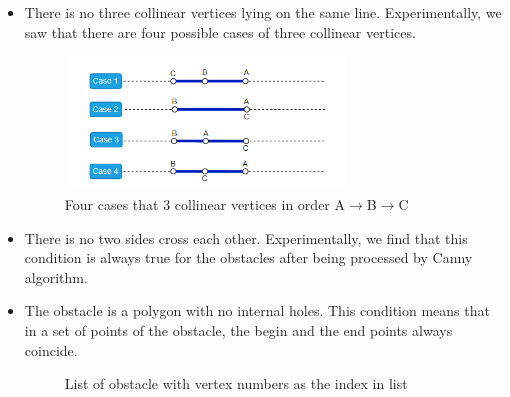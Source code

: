 \documentclass[13pt,a4paper]{article}
\begin{document}
	\begin{itemize}
		\item There is no three collinear vertices lying on the same line. Experimentally, we saw that there are four possible cases of three collinear vertices.
		\begin{figure}[!h]
			\centering
			\includegraphics[width=0.7\textwidth]{Robot_Global_Vision_Update/RGVU_4case_thanghang.png}
			\caption{Four cases that 3 collinear vertices in order A$\rightarrow$B$\rightarrow$C}
		\end{figure}
		
		\item There is no two sides cross each other. Experimentally, we find that this condition is always true for the obstacles after being processed by Canny algorithm.
		\item The obstacle is a polygon with no internal holes. This condition means that in a set of points of the obstacle, the begin and the end points always coincide.\\
		\begin{figure}
			\centering
			\qquad
			\caption{List of obstacle with vertex numbers as the index in list}
			\label{fig:my_label}
		\end{figure}
	\end{itemize}
	
\end{document}
